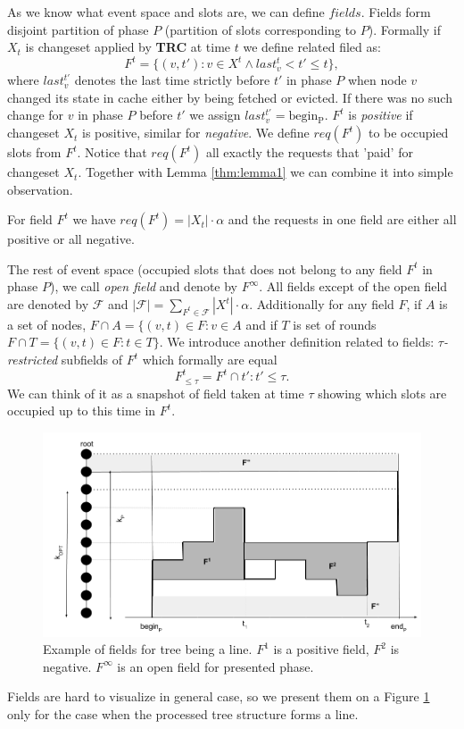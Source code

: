 As we know what event space and slots are, we can define $fields$. Fields 
form disjoint partition of phase $P$ (partition of slots corresponding 
to $P$). Formally if $X_t$ is changeset applied by \textbf{TRC} at time $t$ we 
define related filed as:
$$F^t = \{(v, t'): v \in X^t \wedge last_v^t < t' \leq t\},$$
where $last_v^{t'}$ denotes the last time strictly before $t'$ in phase $P$ 
when node $v$ changed its state in cache either by being fetched or evicted. If 
there was no such change for $v$ in phase $P$ before $t'$ we assign 
$last_v^{t'} = \mathrm{begin_P}$.
$F^t$ is \textit{positive} if changeset $X_t$ is positive, similar for 
\textit{negative}. We define $req(F^t)$ to be occupied slots from $F^t$. Notice 
that $req(F^t)$ all exactly the requests that 'paid' for changeset $X_t$. 
Together with Lemma \ref{thm:lemma1} we can combine it into simple observation.
\begin{observe}
For field $F^t$ we have $req(F^t) = |X_t| \cdot \alpha$ and the requests 
in one field are either all positive or all negative.
\label{obs:observe1}
\end{observe}
The rest of event space (occupied slots that does not belong to any field $F^t$ 
in phase $P$), we call \textit{open field} and denote by $F^{\infty}$. All 
fields except of 
the open field are denoted by $\mathcal{F}$ and $|\mathcal{F}| = \sum_{F^t \in 
\mathcal{F}} |X^t| \cdot \alpha$.
Additionally for any field $F$, if $A$ is a set of nodes, $F \cap A = \{(v,t) 
\in F: v \in A$ and if $T$ is set of rounds $F \cap T = \{(v, t) \in F: t \in 
T\}$. We introduce another definition related to 
fields: $\tau$\textit{-restricted} subfields of 
$F^t$ which formally are equal
$$F^t_{\leq \tau} = F^t \cap {t': t' \leq \tau}.$$
We can think of it as a snapshot of field taken at time $\tau$ showing which 
slots are occupied up to this time in $F^t$.
\begin{figure}
\begin{center}
  \includegraphics[width=1.1\textwidth]{fields.png}
\end{center}
\caption{Example of fields for tree being a line. $F^1$ is a positive field, 
$F^2$ is negative. $F^{\infty}$ is an open field for presented phase.}
\label{fig:fields}
\end{figure}
Fields are hard to visualize in general case, so we present them on a 
Figure \ref{fig:fields} only for the case when the processed tree structure 
forms a line.

